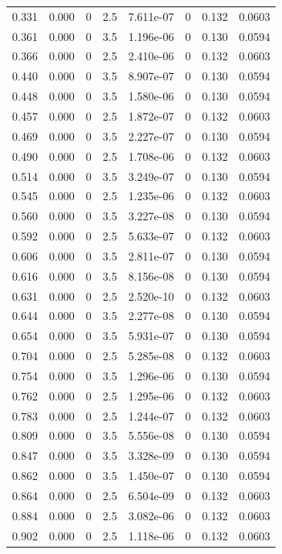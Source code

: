 \documentclass[preview]{standalone}
\begin{document}
{{\begin{tabular}{L{1.2cm}C{1.2cm} C{0.3cm}C{0.5cm} C{1.4cm}C{1.4cm} C{1.4cm}C{1.4cm}}
  0.331  &  0.000  & 0     & 2.5 &  7.611e-07  & 0  & 0.132 &  0.0603   \\ 
  0.361  &  0.000  & 0     & 3.5 &  1.196e-06  & 0  & 0.130 &  0.0594   \\ 
  0.366  &  0.000  & 0     & 2.5 &  2.410e-06  & 0  & 0.132 &  0.0603   \\ 
  0.440  &  0.000  & 0     & 3.5 &  8.907e-07  & 0  & 0.130 &  0.0594   \\ 
  0.448  &  0.000  & 0     & 3.5 &  1.580e-06  & 0  & 0.130 &  0.0594   \\ 
  0.457  &  0.000  & 0     & 2.5 &  1.872e-07  & 0  & 0.132 &  0.0603   \\ 
  0.469  &  0.000  & 0     & 3.5 &  2.227e-07  & 0  & 0.130 &  0.0594   \\ 
  0.490  &  0.000  & 0     & 2.5 &  1.708e-06  & 0  & 0.132 &  0.0603   \\ 
  0.514  &  0.000  & 0     & 3.5 &  3.249e-07  & 0  & 0.130 &  0.0594   \\ 
  0.545  &  0.000  & 0     & 2.5 &  1.235e-06  & 0  & 0.132 &  0.0603   \\ 
  0.560  &  0.000  & 0     & 3.5 &  3.227e-08  & 0  & 0.130 &  0.0594   \\ 
  0.592  &  0.000  & 0     & 2.5 &  5.633e-07  & 0  & 0.132 &  0.0603   \\ 
  0.606  &  0.000  & 0     & 3.5 &  2.811e-07  & 0  & 0.130 &  0.0594   \\ 
  0.616  &  0.000  & 0     & 3.5 &  8.156e-08  & 0  & 0.130 &  0.0594   \\ 
  0.631  &  0.000  & 0     & 2.5 &  2.520e-10  & 0  & 0.132 &  0.0603   \\ 
  0.644  &  0.000  & 0     & 3.5 &  2.277e-08  & 0  & 0.130 &  0.0594   \\ 
  0.654  &  0.000  & 0     & 3.5 &  5.931e-07  & 0  & 0.130 &  0.0594   \\ 
  0.704  &  0.000  & 0     & 2.5 &  5.285e-08  & 0  & 0.132 &  0.0603   \\ 
  0.754  &  0.000  & 0     & 3.5 &  1.296e-06  & 0  & 0.130 &  0.0594   \\ 
  0.762  &  0.000  & 0     & 2.5 &  1.295e-06  & 0  & 0.132 &  0.0603   \\ 
  0.783  &  0.000  & 0     & 2.5 &  1.244e-07  & 0  & 0.132 &  0.0603   \\ 
  0.809  &  0.000  & 0     & 3.5 &  5.556e-08  & 0  & 0.130 &  0.0594   \\ 
  0.847  &  0.000  & 0     & 3.5 &  3.328e-09  & 0  & 0.130 &  0.0594   \\ 
  0.862  &  0.000  & 0     & 3.5 &  1.450e-07  & 0  & 0.130 &  0.0594   \\ 
  0.864  &  0.000  & 0     & 2.5 &  6.504e-09  & 0  & 0.132 &  0.0603   \\ 
  0.884  &  0.000  & 0     & 2.5 &  3.082e-06  & 0  & 0.132 &  0.0603   \\ 
  0.902  &  0.000  & 0     & 2.5 &  1.118e-06  & 0  & 0.132 &  0.0603   \\ 
\hline 
\end{tabular} 

}}
\end{document}

